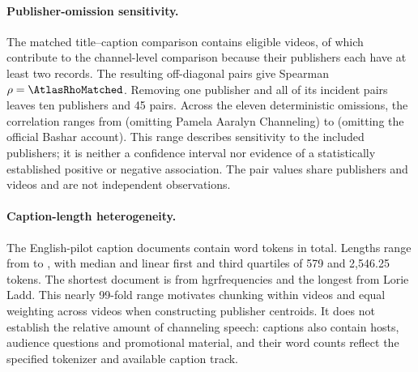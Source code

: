\paragraph{Publisher-omission sensitivity.}
The matched title--caption comparison contains \AtlasNMatchedEligibleVideos{} eligible videos, of which \AtlasNMatchedContributingVideos{} contribute to the channel-level comparison because their \AtlasNMatchedPublishers{} publishers each have at least two records. The resulting \AtlasNMatchedPairs{} off-diagonal pairs give Spearman $\rho=\AtlasRhoMatched$. Removing one publisher and all of its incident pairs leaves ten publishers and 45 pairs. Across the eleven deterministic omissions, the correlation ranges from \AtlasLopoMin{} (omitting Pamela Aaralyn Channeling) to \AtlasLopoMax{} (omitting the official Bashar account). This range describes sensitivity to the included publishers; it is neither a confidence interval nor evidence of a statistically established positive or negative association. The pair values share publishers and videos and are not independent observations.

\paragraph{Caption-length heterogeneity.}
The \AtlasNCaptionPilot{} English-pilot caption documents contain \AtlasCaptionWordsTotal{} word tokens in total. Lengths range from \AtlasCaptionWordsMin{} to \AtlasCaptionWordsMax{}, with median \AtlasCaptionWordsMedian{} and linear first and third quartiles of 579 and 2,546.25 tokens. The shortest document is from hgrfrequencies and the longest from Lorie Ladd. This nearly 99-fold range motivates chunking within videos and equal weighting across videos when constructing publisher centroids. It does not establish the relative amount of channeling speech: captions also contain hosts, audience questions and promotional material, and their word counts reflect the specified tokenizer and available caption track.
